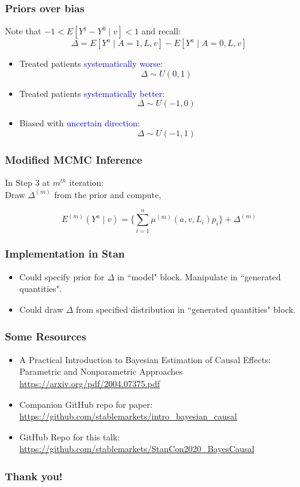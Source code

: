 \documentclass[xcolor=x11names,compress]{beamer}
\renewcommand{\(}{\begin{columns}}
\renewcommand{\)}{\end{columns}}
\newcommand{\<}[1]{\begin{column}{#1}}
\renewcommand{\>}{\end{column}}
\begin{document}
\begin{frame}
	\frametitle{Priors over bias}
	Note that $-1 < E[Y^1 - Y^0 \mid v ] < 1$ and recall:
	$$\Delta  = E[Y^a \mid A=1, L, v] - E[Y^a \mid A=0, L, v] $$
	
	\begin{itemize}
		 
		\item Treated patients \textcolor{blue}{systematically worse}:
		$$ \Delta \sim U(0, 1) $$
		
		 
		\item Treated patients \textcolor{blue}{systematically better}:
		$$ \Delta \sim U(-1, 0) $$
		
		 
		\item Biased with \textcolor{blue}{uncertain direction}:
		$$ \Delta \sim U(-1,1) $$		
	\end{itemize}
\end{frame}

\begin{frame}
	\frametitle{Modified MCMC Inference}

	In Step 3 at $m^{th}$ iteration: \\


	Draw $\Delta^{(m)}$ from the prior and compute, 
	
	$$ E^{(m)}(Y^a \mid v ) =  \Big\{ \sum_{i=1}^n \mu^{(m)}( a, v, L_i ) p_i \Big\} + \Delta^{(m)} $$

\end{frame}

\begin{frame}
	\frametitle{Implementation in Stan}

	\begin{itemize}
		\item Could specify prior for $\Delta$ in ``model" block. Manipulate in ``generated quantities".
		\item Could draw $\Delta$ from specified distribution in ``generated quantities" block.
	\end{itemize}
\end{frame}

\begin{frame}
	\frametitle{Some Resources}

	\begin{itemize}
		\item A Practical Introduction to Bayesian Estimation of Causal Effects: Parametric and Nonparametric Approaches
		\url{https://arxiv.org/pdf/2004.07375.pdf}
		\item Companion GitHub repo for paper:
		\url{https://github.com/stablemarkets/intro_bayesian_causal}
		\item GitHub Repo for this talk:
		\url{https://github.com/stablemarkets/StanCon2020_BayesCausal}
	\end{itemize}
\end{frame}

\begin{frame}
	\frametitle{Thank you!}

\end{frame}
\end{document}
